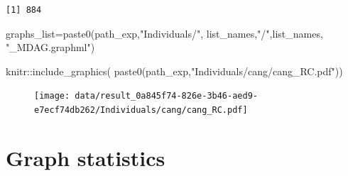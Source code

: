 \documentclass[
  letterpaper,
  DIV=11,
  numbers=noendperiod]{scrreprt}
\newenvironment{Shaded}{}{}
\newcommand{\FunctionTok}[1]{\textcolor[rgb]{0.38,0.69,0.94}{#1}}
\newcommand{\NormalTok}[1]{\textcolor[rgb]{0.67,0.70,0.75}{#1}}
\newcommand{\OtherTok}[1]{\textcolor[rgb]{0.15,0.68,0.38}{#1}}
\newcommand{\SpecialCharTok}[1]{\textcolor[rgb]{0.34,0.71,0.76}{#1}}
\newcommand{\StringTok}[1]{\textcolor[rgb]{0.60,0.76,0.47}{#1}}
\begin{document}
\begin{verbatim}
[1] 884
\end{verbatim}

\begin{Shaded}
\begin{Highlighting}[]
\NormalTok{graphs\_list}\OtherTok{=}\FunctionTok{paste0}\NormalTok{(path\_exp,}\StringTok{"Individuals/"}\NormalTok{,}
\NormalTok{                   list\_names,}\StringTok{"/"}\NormalTok{,list\_names,}
                   \StringTok{"\_MDAG.graphml"}\NormalTok{)}
\end{Highlighting}
\end{Shaded}

\begin{Shaded}
\begin{Highlighting}[]
\NormalTok{knitr}\SpecialCharTok{::}\FunctionTok{include\_graphics}\NormalTok{(}
  \FunctionTok{paste0}\NormalTok{(path\_exp,}\StringTok{"Individuals/cang/cang\_RC.pdf"}\NormalTok{))}
\end{Highlighting}
\end{Shaded}

\begin{figure}[H]

{\centering \texttt{[image: data/result\_0a845f74-826e-3b46-aed9-e7ecf74db262/Individuals/cang/cang\_RC.pdf]}

}

\end{figure}

\hypertarget{graph-statistics}{%
\section{Graph statistics}\label{graph-statistics}}
\end{document}
